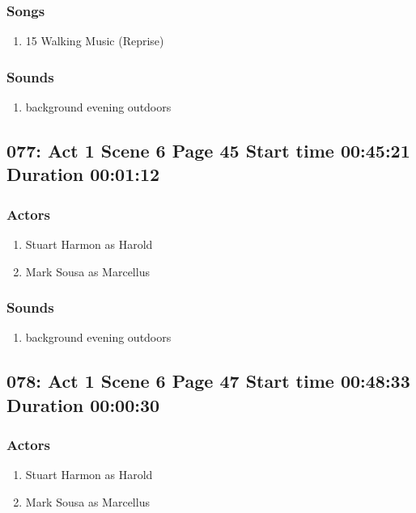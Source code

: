 \subsubsection{Songs}
\begin{enumerate}
\item 15 Walking Music (Reprise)
\end{enumerate}\subsubsection{Sounds}
\begin{enumerate}
\item background evening outdoors
\end{enumerate}
\subsection{077: Act 1 Scene 6 Page 45 Start time 00:45:21 Duration 00:01:12}

\subsubsection{Actors}
\begin{enumerate}
\item Stuart Harmon as Harold
\item Mark Sousa as Marcellus
\end{enumerate}

\subsubsection{Sounds}
\begin{enumerate}
\item background evening outdoors
\end{enumerate}
\subsection{078: Act 1 Scene 6 Page 47 Start time 00:48:33 Duration 00:00:30}

\subsubsection{Actors}
\begin{enumerate}
\item Stuart Harmon as Harold
\item Mark Sousa as Marcellus
\end{enumerate}

